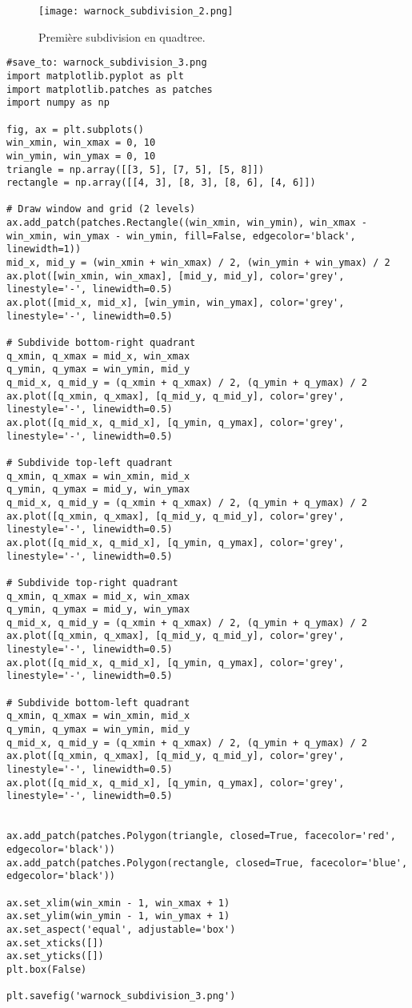 \documentclass{article}
\begin{document}
\begin{figure}[H]
\centering
\texttt{[image: warnock\_subdivision\_2.png]}
\caption{Première subdivision en quadtree.}
\label{fig:warnock_subdiv_2}
\end{figure}

\begin{verbatim}
#save_to: warnock_subdivision_3.png
import matplotlib.pyplot as plt
import matplotlib.patches as patches
import numpy as np

fig, ax = plt.subplots()
win_xmin, win_xmax = 0, 10
win_ymin, win_ymax = 0, 10
triangle = np.array([[3, 5], [7, 5], [5, 8]])
rectangle = np.array([[4, 3], [8, 3], [8, 6], [4, 6]])

# Draw window and grid (2 levels)
ax.add_patch(patches.Rectangle((win_xmin, win_ymin), win_xmax - win_xmin, win_ymax - win_ymin, fill=False, edgecolor='black', linewidth=1))
mid_x, mid_y = (win_xmin + win_xmax) / 2, (win_ymin + win_ymax) / 2
ax.plot([win_xmin, win_xmax], [mid_y, mid_y], color='grey', linestyle='-', linewidth=0.5)
ax.plot([mid_x, mid_x], [win_ymin, win_ymax], color='grey', linestyle='-', linewidth=0.5)

# Subdivide bottom-right quadrant
q_xmin, q_xmax = mid_x, win_xmax
q_ymin, q_ymax = win_ymin, mid_y
q_mid_x, q_mid_y = (q_xmin + q_xmax) / 2, (q_ymin + q_ymax) / 2
ax.plot([q_xmin, q_xmax], [q_mid_y, q_mid_y], color='grey', linestyle='-', linewidth=0.5)
ax.plot([q_mid_x, q_mid_x], [q_ymin, q_ymax], color='grey', linestyle='-', linewidth=0.5)

# Subdivide top-left quadrant
q_xmin, q_xmax = win_xmin, mid_x
q_ymin, q_ymax = mid_y, win_ymax
q_mid_x, q_mid_y = (q_xmin + q_xmax) / 2, (q_ymin + q_ymax) / 2
ax.plot([q_xmin, q_xmax], [q_mid_y, q_mid_y], color='grey', linestyle='-', linewidth=0.5)
ax.plot([q_mid_x, q_mid_x], [q_ymin, q_ymax], color='grey', linestyle='-', linewidth=0.5)

# Subdivide top-right quadrant
q_xmin, q_xmax = mid_x, win_xmax
q_ymin, q_ymax = mid_y, win_ymax
q_mid_x, q_mid_y = (q_xmin + q_xmax) / 2, (q_ymin + q_ymax) / 2
ax.plot([q_xmin, q_xmax], [q_mid_y, q_mid_y], color='grey', linestyle='-', linewidth=0.5)
ax.plot([q_mid_x, q_mid_x], [q_ymin, q_ymax], color='grey', linestyle='-', linewidth=0.5)

# Subdivide bottom-left quadrant
q_xmin, q_xmax = win_xmin, mid_x
q_ymin, q_ymax = win_ymin, mid_y
q_mid_x, q_mid_y = (q_xmin + q_xmax) / 2, (q_ymin + q_ymax) / 2
ax.plot([q_xmin, q_xmax], [q_mid_y, q_mid_y], color='grey', linestyle='-', linewidth=0.5)
ax.plot([q_mid_x, q_mid_x], [q_ymin, q_ymax], color='grey', linestyle='-', linewidth=0.5)


ax.add_patch(patches.Polygon(triangle, closed=True, facecolor='red', edgecolor='black'))
ax.add_patch(patches.Polygon(rectangle, closed=True, facecolor='blue', edgecolor='black'))

ax.set_xlim(win_xmin - 1, win_xmax + 1)
ax.set_ylim(win_ymin - 1, win_ymax + 1)
ax.set_aspect('equal', adjustable='box')
ax.set_xticks([])
ax.set_yticks([])
plt.box(False)

plt.savefig('warnock_subdivision_3.png')
\end{verbatim}
\end{document}
